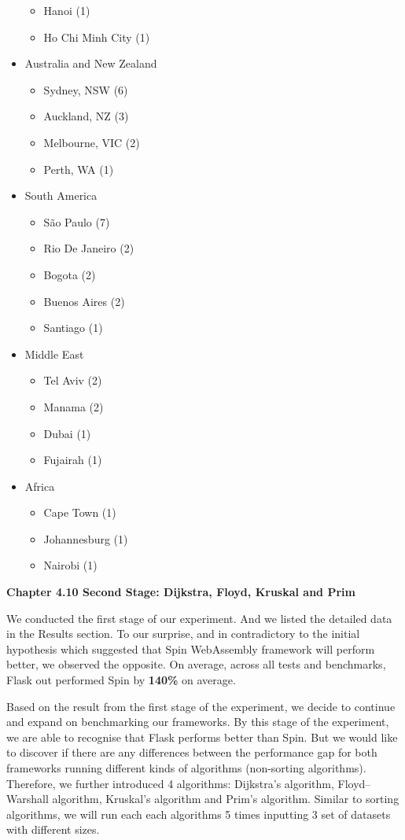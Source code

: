 \begin{itemize}
\begin{itemize}
     \item Hanoi (1)
     \item Ho Chi Minh City (1)
   \end{itemize}
   \item Australia and New Zealand
   \begin{itemize}
     \item Sydney, NSW (6)
     \item Auckland, NZ (3)
     \item Melbourne, VIC (2)
     \item Perth, WA (1)
   \end{itemize}
   \item South America
   \begin{itemize}
     \item São Paulo (7)
     \item Rio De Janeiro (2)
     \item Bogota (2)
     \item Buenos Aires (2)
     \item Santiago (1)
   \end{itemize}
   \item Middle East
   \begin{itemize}
     \item Tel Aviv (2)
     \item Manama (2)
     \item Dubai (1)
     \item Fujairah (1)
   \end{itemize}
   \item Africa
   \begin{itemize}
     \item Cape Town (1)
     \item Johannesburg (1)
     \item Nairobi (1)
   \end{itemize}
\end{itemize}
 
\bigskip
\textbf{{\Large Chapter 4.10 Second Stage: Dijkstra, Floyd, Kruskal and Prim}}

We conducted the first stage of our experiment. And we listed the detailed data in the Results section. To our surprise, and in contradictory to the initial hypothesis which suggested that Spin WebAssembly framework will perform better, we observed the opposite. On average, across all tests and benchmarks, Flask out performed Spin by \textbf{140\%} on average.

Based on the result from the first stage of the experiment, we decide to continue and expand on benchmarking our frameworks. By this stage of the experiment, we are able to recognise that Flask performs better than Spin. But we would like to discover if there are any differences between the performance gap for both frameworks running different kinds of algorithms (non-sorting algorithms). Therefore, we further introduced 4 algorithms: Dijkstra's algorithm, Floyd–Warshall algorithm, Kruskal's algorithm and Prim's algorithm. Similar to sorting algorithms, we will run each each algorithms 5 times inputting 3 set of datasets with different sizes.

